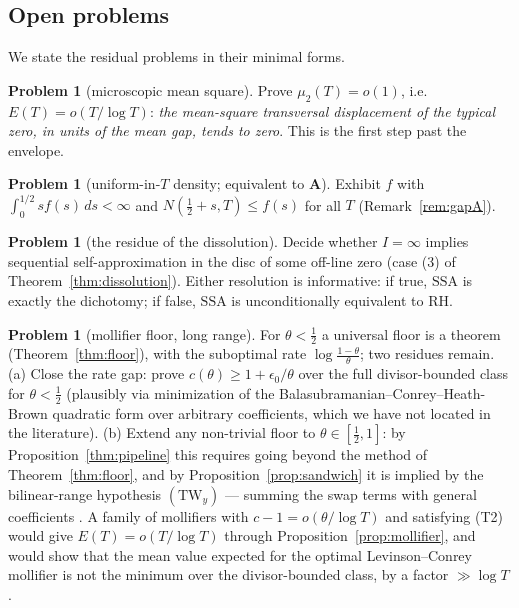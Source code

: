 \documentclass[11pt]{amsart}
\theoremstyle{plain}
\theoremstyle{definition}
\newtheorem{problem}[theorem]{Problem}
\theoremstyle{remark}
\newcommand{\RH}{\mathrm{RH}}
\newcommand{\Aax}{\mathbf{A}}
\begin{document}
\subsection{Open problems}

We state the residual problems in their minimal forms.

\begin{problem}[microscopic mean square]\label{prob:mu2}
Prove $\mu_2(T)=o(1)$, i.e.\ $E(T)=o(T/\log T)$: \emph{the mean-square transversal displacement of the typical zero, in units of the mean gap, tends to zero}. This is the first step past the envelope.
\end{problem}

\begin{problem}[uniform-in-$T$ density; equivalent to $\Aax$]\label{prob:gapA}
Exhibit $f$ with $\int_0^{1/2}sf(s)\,ds<\infty$ and $N(\tfrac12+s,T)\le f(s)$ for all $T$ \textup{(}Remark~\ref{rem:gapA}\textup{)}.
\end{problem}

\begin{problem}[the residue of the dissolution]\label{prob:residue}
Decide whether $I=\infty$ implies sequential self-approximation in the disc of some off-line zero \textup{(}case \textup{(3)} of Theorem~\ref{thm:dissolution}\textup{)}. Either resolution is informative: if true, $\mathrm{SSA}$ is exactly the dichotomy; if false, $\mathrm{SSA}$ is unconditionally equivalent to $\RH$.
\end{problem}

\begin{problem}[mollifier floor, long range]\label{prob:farmer}
For $\theta<\tfrac12$ a universal floor is a theorem (Theorem~\ref{thm:floor}), with the suboptimal rate $\log\frac{1-\theta}\theta$; two residues remain. \textup{(a)} Close the rate gap: prove $c(\theta)\ge1+\epsilon_0/\theta$ over the full divisor-bounded class for $\theta<\tfrac12$ \textup{(}plausibly via minimization of the Balasubramanian--Conrey--Heath-Brown quadratic form \cite{BCHB1985} over arbitrary coefficients, which we have not located in the literature\textup{)}. \textup{(b)} Extend any non-trivial floor to $\theta\in[\tfrac12,1]$: by Proposition~\ref{thm:pipeline} this requires going beyond the method of Theorem~\ref{thm:floor}, and by Proposition~\ref{prop:sandwich} it is implied by the bilinear-range hypothesis $(\mathrm{TW}_y)$ --- summing the swap terms with general coefficients \cite{Gonek1984}. A family of mollifiers with $c-1=o(\theta/\log T)$ and satisfying \textup{(T2)} would give $E(T)=o(T/\log T)$ through Proposition~\ref{prop:mollifier}, and would show that the mean value expected for the optimal Levinson--Conrey mollifier \cite{Farmer1993,BettinGonek2017} is not the minimum over the divisor-bounded class, by a factor $\gg\log T$.
\end{problem}
\end{document}
